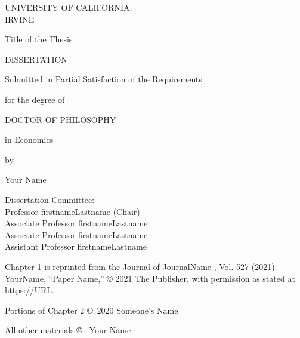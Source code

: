 \documentclass[letterpaper]{report}
\begin{document}
\pagestyle{cover}
\begin{center}
  \vspace*{1.72cm}
  UNIVERSITY OF CALIFORNIA,\\IRVINE
  
  \vspace*{1cm}
  Title of the Thesis
  
  \vspace*{0.25cm}
  DISSERTATION
  
  \vspace*{0.9cm}
  Submitted in Partial Satisfaction of the Requirements
  
  for the degree of
  
  \vspace*{0.73cm}
  DOCTOR OF PHILOSOPHY
  
  \vspace*{0.3cm}
  in Economics
  
  \vspace*{0.9cm}
  by
  
  \vspace*{0.9cm}
  Your Name
\end{center}

\vfill
\begin{flushright}
  Dissertation Committee:\\
  Professor firstnameLastname (Chair)\\
  Associate Professor firstnameLastname\\
  Associate Professor firstnameLastname\\
  Assistant Professor firstnameLastname
\end{flushright}

\vspace*{\fill}
\begin{center}
  \the\year{}
\end{center}

\newpage
\pagestyle{copyright}
\vspace*{\fill}
\begin{center}
  Chapter 1 is reprinted from the Journal of JournalName , Vol. 527 (2021). YourName, “Paper Name,” © 2021 The Publisher, with permission as stated at https://URL.
  
  Portions of Chapter 2 \copyright \ 2020 Someone's Name
  
  All other materials \copyright \ \the\year{} Your Name
\end{center}
\end{document}
